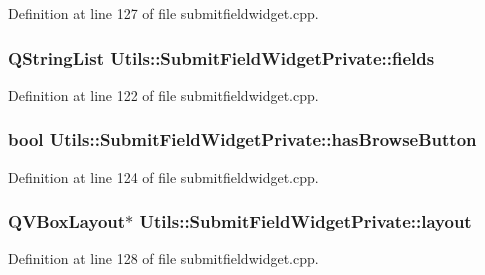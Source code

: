 \-Definition at line 127 of file submitfieldwidget.\-cpp.

\hypertarget{struct_utils_1_1_submit_field_widget_private_aa7af2d96737934b56cd589feca4774e7}{
\subsubsection[{fields}]{\setlength{\rightskip}{0pt plus 5cm}\-Q\-String\-List {\bf \-Utils\-::\-Submit\-Field\-Widget\-Private\-::fields}}}\label{struct_utils_1_1_submit_field_widget_private_aa7af2d96737934b56cd589feca4774e7}


\-Definition at line 122 of file submitfieldwidget.\-cpp.

\hypertarget{struct_utils_1_1_submit_field_widget_private_a9c7298aa72b495edb1946454ce1198fa}{
\subsubsection[{has\-Browse\-Button}]{\setlength{\rightskip}{0pt plus 5cm}bool {\bf \-Utils\-::\-Submit\-Field\-Widget\-Private\-::has\-Browse\-Button}}}\label{struct_utils_1_1_submit_field_widget_private_a9c7298aa72b495edb1946454ce1198fa}


\-Definition at line 124 of file submitfieldwidget.\-cpp.

\hypertarget{struct_utils_1_1_submit_field_widget_private_a82ba5b210f1399e3914cf70ed0ea88fd}{
\subsubsection[{layout}]{\setlength{\rightskip}{0pt plus 5cm}\-Q\-V\-Box\-Layout$\ast$ {\bf \-Utils\-::\-Submit\-Field\-Widget\-Private\-::layout}}}\label{struct_utils_1_1_submit_field_widget_private_a82ba5b210f1399e3914cf70ed0ea88fd}


\-Definition at line 128 of file submitfieldwidget.\-cpp.

